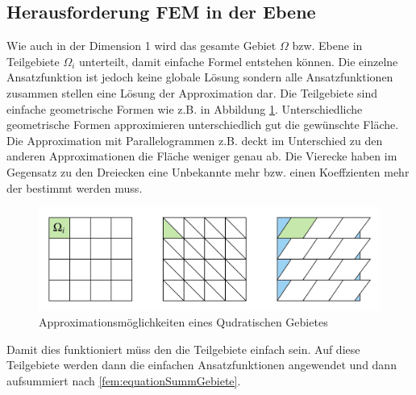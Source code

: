 \subsection{Herausforderung FEM in der Ebene}
Wie auch in der Dimension 1 wird das gesamte Gebiet $\Omega$ bzw. Ebene in Teilgebiete $\Omega_i$ unterteilt, damit einfache Formel entstehen können. Die einzelne Ansatzfunktion ist jedoch keine globale Lösung sondern alle Ansatzfunktionen zusammen stellen eine Lösung der Approximation dar. Die Teilgebiete sind einfache geometrische Formen wie z.B. in Abbildung \ref{fig:Figuren}. Unterschiedliche geometrische Formen approximieren unterschiedlich gut die gewünschte Fläche. Die Approximation mit Parallelogrammen z.B.  deckt im Unterschied zu den anderen Approximationen die Fläche weniger genau ab. Die Vierecke haben im Gegensatz zu den Dreiecken eine Unbekannte mehr bzw. einen Koeffzienten mehr der bestimmt werden  muss.
\begin{figure}[h!]
	\centering
	\includegraphics[scale=0.6]{papers/fem/Images/Figuren.jpeg}
	\caption{Approximationsmöglichkeiten eines Qudratischen Gebietes}
	\label{fig:Figuren}
\end{figure}
Damit dies funktioniert müss den die Teilgebiete einfach sein. Auf diese Teilgebiete werden dann die einfachen Ansatzfunktionen angewendet und dann aufsummiert nach \eqref{fem:equationSummGebiete}.

